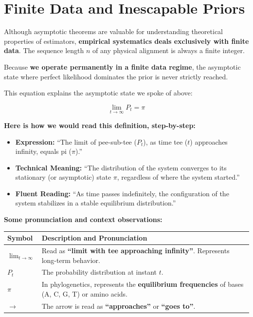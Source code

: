 \section{Finite Data and Inescapable Priors}

Although asymptotic theorems are valuable for understanding theoretical properties of estimators, \textbf{empirical systematics deals exclusively with finite data}. The sequence length $n$ of any physical alignment is always a finite integer.

Because \textbf{we operate permanently in a finite data regime}, the asymptotic state where perfect likelihood dominates the prior is never strictly reached.

This equation explains the asymptotic state we spoke of above:

\begin{equation*}
    \lim_{t \to \infty} P_t = \pi
\end{equation*}

\textbf{Here is how we would read this definition, step-by-step:}

\begin{itemize}
    \item \textbf{Expression:} ``The limit of pee-sub-tee ($P_t$), as time tee ($t$) approaches infinity, equals pi ($\pi$).''
    \item \textbf{Technical Meaning:} ``The distribution of the system converges to its stationary (or asymptotic) state $\pi$, regardless of where the system started.''
    \item \textbf{Fluent Reading:} ``As time passes indefinitely, the configuration of the system stabilizes in a stable equilibrium distribution.''
\end{itemize}

\vspace{0.5cm}

\textbf{Some pronunciation and context observations:}

\begin{center}
\renewcommand{\arraystretch}{1.5}
\begin{tabular}{lp{10cm}}
\hline
\textbf{Symbol} & \textbf{Description and Pronunciation} \\ \hline
$\lim_{t \to \infty}$ & Read as \textbf{``limit with tee approaching infinity''}. Represents long-term behavior. \\
$P_t$ & The probability distribution at instant $t$. \\
$\pi$ & In phylogenetics, represents the \textbf{equilibrium frequencies} of bases (A, C, G, T) or amino acids. \\
$\to$ & The arrow is read as \textbf{``approaches''} or \textbf{``goes to''}. \\ \hline
\end{tabular}
\end{center}

